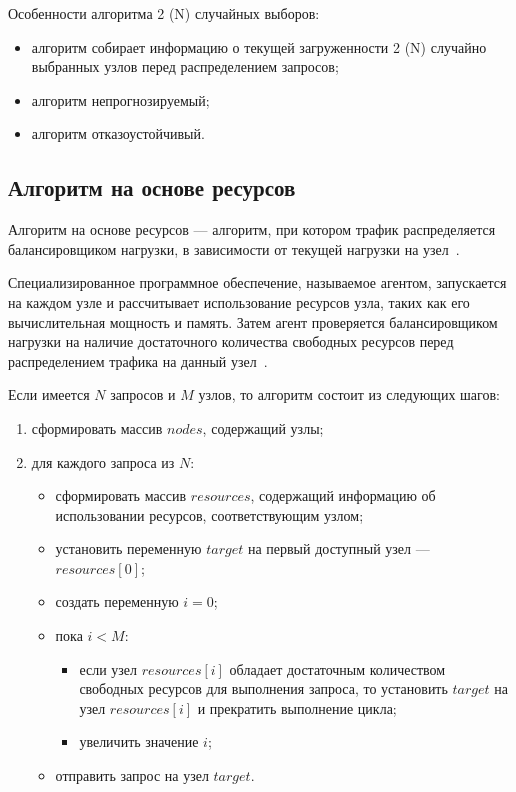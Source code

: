 Особенности алгоритма 2 (N) случайных выборов:
\begin{itemize}
    \item алгоритм собирает информацию о текущей загруженности 2 (N) случайно выбранных узлов перед распределением запросов;
    \item алгоритм непрогнозируемый;
    \item алгоритм отказоустойчивый.
\end{itemize}

\subsection{Алгоритм на основе ресурсов}

Алгоритм на основе ресурсов --- алгоритм, при котором трафик распределяется балансировщиком нагрузки, в зависимости от текущей нагрузки на узел~\cite{aws}.

Специализированное программное обеспечение, называемое агентом, запускается на каждом узле и рассчитывает использование ресурсов узла, таких как его вычислительная мощность и память. 
Затем агент проверяется балансировщиком нагрузки на наличие достаточного количества свободных ресурсов перед распределением трафика на данный узел~\cite{aws}.

Если имеется $N$ запросов и $M$ узлов, то алгоритм состоит из следующих шагов:
\begin{enumerate}
	\item сформировать массив $nodes$, содержащий узлы;
	\item для каждого запроса из $N$:
	\begin{itemize}
		\item сформировать массив $resources$, содержащий информацию об использовании ресурсов, соответствующим узлом;
		\item установить переменную $target$ на первый доступный узел --- $resources[0]$;
		\item создать переменную $i = 0$;
		\item пока $i < M$:
		\begin{itemize}
			\item если узел $resources[i]$ обладает достаточным количеством свободных ресурсов для выполнения запроса, то установить $target$ на узел $resources[i]$ и  прекратить выполнение цикла;
			\item увеличить значение $i$;
		\end{itemize}
		\item отправить запрос на узел $target$.
	\end{itemize}
\end{enumerate}

